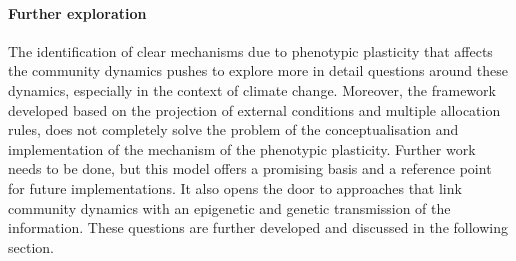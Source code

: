 \paragraph{Further exploration}

The identification of clear mechanisms due to phenotypic plasticity that affects the community dynamics pushes to explore more in detail questions around these dynamics, especially in the context of climate change. Moreover, the framework developed based on the projection of external conditions and multiple allocation rules, does not completely solve the problem of the conceptualisation and implementation of the mechanism of the phenotypic plasticity. Further work needs to be done, but this model offers a promising basis and a reference point for future implementations. It also opens the door to approaches that link community dynamics with an epigenetic and genetic transmission of the information. These questions are further developed and discussed in the following section.



